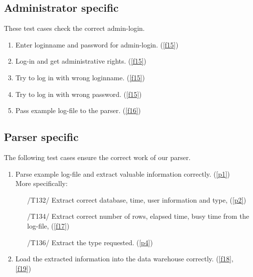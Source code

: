\subsection{Administrator specific}

These test cases check the correct admin-login.

\begin{enumerate}[resume*=test]

\item Enter loginname and password for admin-login. (\ref{f15})
\label{t17}

\item Log-in and get administrative rights. (\ref{f15})
\label{t18}

\item Try to log in with wrong loginname. (\ref{f15})
\label{t19}

\item Try to log in with wrong password. (\ref{f15})
\label{t20}

\item Pass example log-file to the parser. (\ref{f16})
\label{t21}


\end{enumerate}

\newpage
\subsection{Parser specific}

The following test cases ensure the correct work of our parser.

\begin{enumerate}[resume*=test]

\item Parse example log-file and extract valuable information correctly. (\ref{p1})
	\\ More specifically: 
\label{t22}
  \begin{enumerate}

	\item[/T132/] Extract correct database, time, user information 
	and type, (\ref{p2})
\label{t23}

	\item[/T134/] Extract correct number of rows, elapsed time, 
	busy time from the log-file, (\ref{f17})
\label{t24}	
	
	\item[/T136/] Extract the type requested. (\ref{p4})
\label{t25}

  \end{enumerate}

\item Load the extracted information into the data warehouse correctly. (\ref{f18}, \ref{f19})
\label{t26}

\end{enumerate}


